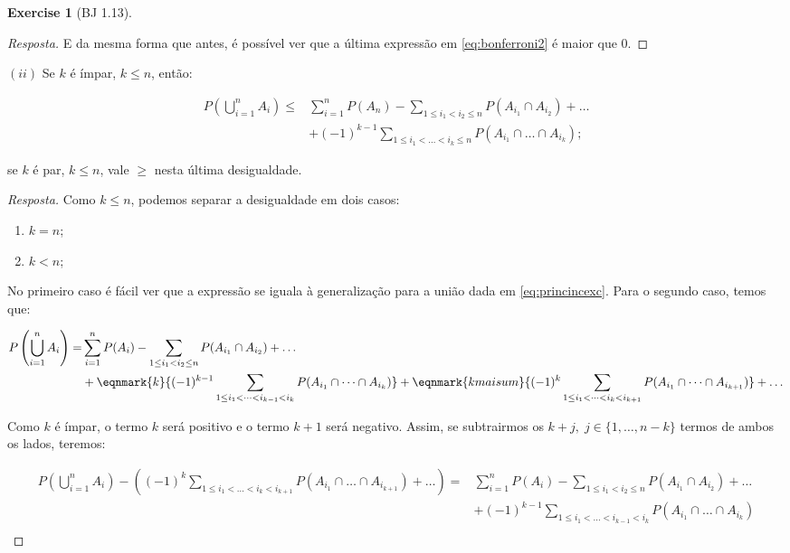 \documentclass[
]{article}
\providecommand{\tightlist}{%
  \setlength{\itemsep}{0pt}\setlength{\parskip}{0pt}}
\theoremstyle{definition}
\theoremstyle{definition}
\theoremstyle{definition}
\newtheorem{exercise}{Exercise}[section]
\theoremstyle{definition}
\theoremstyle{remark}
\begin{document}
\begin{exercise}[BJ 1.13]
\begin{proof}[Resposta]
E da mesma forma que antes, é possível ver que a última expressão em \eqref{eq:bonferroni2} é maior que 0.
\end{proof}

\((ii)\) Se \(k\) é ímpar, \(k \le n\), então:

\begin{align*}
P\left(\bigcup_{i=1}^{n} A_{i}\right) \le &\sum_{i=1}^{n}P(A_{n}) - \sum_{1 \le i_{1} < i_{2} \le n}P(A_{i_{1}} \cap A_{i_{2}}) + \dots \\
&+ (-1)^{k-1} \sum_{1 \le i_{1} < \dots < i_{k} \le n}P(A_{i_{1}} \cap \dots \cap A_{i_{k}});
\end{align*}

se \(k\) é par, \(k \le n\), vale \(\ge\) nesta última desigualdade.

\begin{proof}[Resposta]
Como \(k \le n\), podemos separar a desigualdade em dois casos:

\begin{enumerate}
\def\labelenumi{\arabic{enumi}.}
\tightlist
\item
  \(k = n\);
\item
  \(k < n\);
\end{enumerate}

No primeiro caso é fácil ver que a expressão se iguala à generalização para a união dada em \eqref{eq:princincexc}. Para o segundo caso, temos que:

\begin{align*}
P\left(\bigcup_{i=1}^{n} A_{i}\right) = &\sum_{i=1}^{n}P(A_{i}) - \sum_{1 \le i_{1} < i_{2} \le n}P(A_{i_{1}} \cap A_{i_{2}}) + \dots \\
&+ \eqnmark{k}{(-1)^{k-1} \sum_{1 \le i_{1} < \dots < i_{k-1} < i_{k}}P(A_{i_{1}} \cap \dots \cap A_{i_{k}})} + \eqnmark{kmaisum}{(-1)^{k} \sum_{1 \le i_{1} < \dots < i_{k} < i_{k+1}}P(A_{i_{1}} \cap \dots \cap A_{i_{k+1}})} + \dots \\
\end{align*}

Como \(k\) é ímpar, o termo \(k\) será positivo e o termo \(k+1\) será negativo. Assim, se subtrairmos os \(k+j,\; j \in\{1,\dots,n-k\}\) termos de ambos os lados, teremos:

\begin{equation*}
\begin{split}
P\left(\bigcup_{i=1}^{n} A_{i}\right) - \left((-1)^{k} \sum_{1 \le i_{1} < \dots < i_{k} < i_{k+1}}P(A_{i_{1}} \cap \dots \cap A_{i_{k+1}}) + \dots \right) = &\sum_{i=1}^{n}P(A_{i}) - \sum_{1 \le i_{1} < i_{2} \le n}P(A_{i_{1}} \cap A_{i_{2}}) + \dots \\
&+ (-1)^{k-1} \sum_{1 \le i_{1} < \dots < i_{k-1} < i_{k}}P(A_{i_{1}} \cap \dots \cap A_{i_{k}}) \\
\end{split}
\end{equation*}


\end{proof}
\end{exercise}
\end{document}
